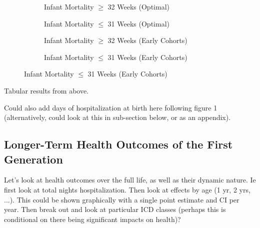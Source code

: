 \documentclass[11pt]{article}
\begin{document}
\begin{spacing}{1.5}
\begin{figure}[htpb!]
    \begin{subfigure}{.45\textwidth}
      \centering
      \caption{Infant Mortality $\geq$ 32 Weeks (Optimal)}
      \label{fig:IMROPT32}
    \end{subfigure}
    \begin{subfigure}{.45\textwidth}
      \centering
      \caption{Infant Mortality $\leq$ 31 Weeks (Optimal)}
      \label{fig:IMROPT31}
    \end{subfigure}

    \begin{subfigure}{.45\textwidth}
      \centering
      \caption{Infant Mortality $\geq$ 32 Weeks (Early Cohorts)}
      \label{fig:IMROPT32}
    \end{subfigure}
    \begin{subfigure}{.45\textwidth}
      \centering
      \caption{Infant Mortality $\leq$ 31 Weeks (Early Cohorts)}
      \label{fig:IMROPT31}
    \end{subfigure}
  \end{figure}


  Tabular results from above.
  

  Could also add days of hospitalization at birth here following figure 1 (alternatively, could look at this in sub-section below, or as an appendix).
  
  \subsection{Longer-Term Health Outcomes of the First Generation}
  Let's look at health outcomes over the full life, as well as their dynamic nature.  Ie first look at total nights hospitalization.  Then look at effects by age (1 yr, 2 yrs, ...). This could be shown graphically with a single point estimate and CI per year.  Then break out and look at particular ICD classes (perhaps this is conditional on there being significant impacts on health)?
  

\end{spacing}
\end{document}
